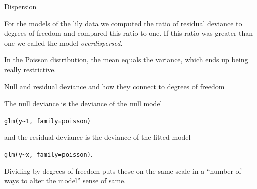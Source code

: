 \documentclass[
  ignorenonframetext,
]{beamer}
\begin{document}
\begin{frame}{Dispersion}
\protect\hypertarget{dispersion}{}

For the models of the lily data we computed the ratio of residual
deviance to degrees of freedom and compared this ratio to one. If this
ratio was greater than one we called the model \emph{overdispersed}.

In the Poisson distribution, the mean equals the variance, which ends up
being really restrictive.

\end{frame}

\begin{frame}[fragile]{Null and residual deviance and how they connect
to degrees of freedom}
\protect\hypertarget{null-and-residual-deviance-and-how-they-connect-to-degrees-of-freedom}{}

The null deviance is the deviance of the null model

\texttt{glm(y\textasciitilde{}1,\ family=poisson)}

and the residual deviance is the deviance of the fitted model

\texttt{glm(y\textasciitilde{}x,\ family=poisson)}.

Dividing by degrees of freedom puts these on the same scale in a
``number of ways to alter the model'' sense of same.

\end{frame}
\end{document}
